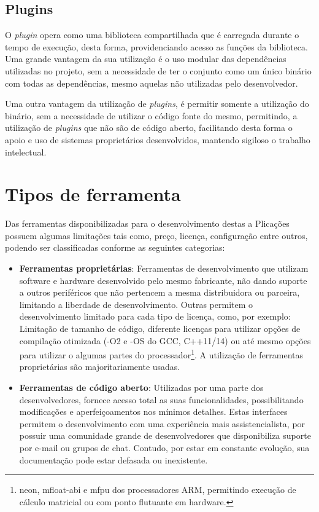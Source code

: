 
\subsection{Plugins}
O \textit{plugin} opera como uma biblioteca compartilhada que é carregada durante o tempo de execução, desta forma, providenciando acesso as funções da biblioteca. Uma grande vantagem da sua utilização é o uso modular das dependências utilizadas no projeto, sem a necessidade de ter o conjunto como um único binário com todas as dependências, mesmo aquelas não utilizadas pelo desenvolvedor.

Uma outra vantagem da utilização de \textit{plugins}, é permitir somente a utilização do binário, sem a necessidade de utilizar
o código fonte do mesmo, permitindo, a utilização de \textit{plugins} que não são de código aberto, facilitando desta
forma o apoio e uso de sistemas proprietários desenvolvidos, mantendo sigiloso o trabalho intelectual.

\section{Tipos de ferramenta}
Das ferramentas disponibilizadas para o desenvolvimento destas a Plicações possuem algumas limitações tais como, preço, licença, configuração entre outros, podendo ser classificadas conforme as seguintes categorias:

\begin{itemize}
 \item \textbf{Ferramentas proprietárias}: Ferramentas de desenvolvimento que utilizam software e hardware desenvolvido pelo mesmo fabricante, não dando suporte a outros periféricos que não pertencem a mesma distribuidora ou parceira, limitando a liberdade de desenvolvimento. Outras permitem o desenvolvimento limitado para cada tipo de licença, como, por exemplo: Limitação de tamanho de código\cite{simplicity}, diferente licenças para utilizar opções de compilação otimizada (-O2 e -OS do GCC, C++11/14)\cite{armdeveloper} ou até mesmo opções para utilizar o algumas partes do processador\footnote{neon, mfloat-abi e mfpu dos processadores ARM, permitindo execução de cálculo matricial ou com ponto flutuante em hardware.}\cite{neon}. A utilização de ferramentas proprietárias são majoritariamente usadas.

 \item \textbf{Ferramentas de código aberto}: Utilizadas por uma parte dos desenvolvedores, fornece acesso total as suas funcionalidades, possibilitando modificações e aperfeiçoamentos nos mínimos detalhes. Estas interfaces permitem o desenvolvimento com uma experiência mais assistencialista, por possuir uma comunidade grande de desenvolvedores que disponibiliza suporte por e-mail ou grupos de chat. Contudo, por estar em constante evolução, sua documentação pode estar defasada ou inexistente.

\end{itemize}

